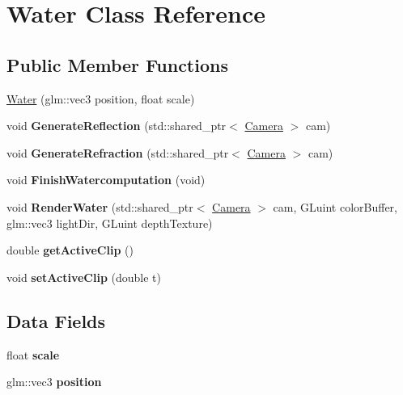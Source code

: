 \hypertarget{class_water}{}\section{Water Class Reference}
\label{class_water}
\subsection*{Public Member Functions}
\begin{DoxyCompactItemize}
\item 
\hyperlink{class_water_a456fec66ab6833de7615dc9fb212ae2a}{Water} (glm\+::vec3 position, float scale)
\item 
void {\bfseries Generate\+Reflection} (std\+::shared\+\_\+ptr$<$ \hyperlink{class_camera}{Camera} $>$ cam)\hypertarget{class_water_a665e0995f977f0797979bca4e621f8f8}{}\label{class_water_a665e0995f977f0797979bca4e621f8f8}

\item 
void {\bfseries Generate\+Refraction} (std\+::shared\+\_\+ptr$<$ \hyperlink{class_camera}{Camera} $>$ cam)\hypertarget{class_water_a2a57daac51ef0c634ced3f2523052cff}{}\label{class_water_a2a57daac51ef0c634ced3f2523052cff}

\item 
void {\bfseries Finish\+Watercomputation} (void)\hypertarget{class_water_aa69302dc7573d79027ef421dbed2f886}{}\label{class_water_aa69302dc7573d79027ef421dbed2f886}

\item 
void {\bfseries Render\+Water} (std\+::shared\+\_\+ptr$<$ \hyperlink{class_camera}{Camera} $>$ cam, G\+Luint color\+Buffer, glm\+::vec3 light\+Dir, G\+Luint depth\+Texture)\hypertarget{class_water_a305bbc4666b053999e2e76255ee9bff2}{}\label{class_water_a305bbc4666b053999e2e76255ee9bff2}

\item 
double {\bfseries get\+Active\+Clip} ()\hypertarget{class_water_af78362ca8b5b15433918a8b78ff5c5a5}{}\label{class_water_af78362ca8b5b15433918a8b78ff5c5a5}

\item 
void {\bfseries set\+Active\+Clip} (double t)\hypertarget{class_water_a67c2beafbe5bfff5e6b322de69a9194e}{}\label{class_water_a67c2beafbe5bfff5e6b322de69a9194e}

\end{DoxyCompactItemize}
\subsection*{Data Fields}
\begin{DoxyCompactItemize}
\item 
float {\bfseries scale}\hypertarget{class_water_a7854d71f9de93cd6c9bf359aea0e3d26}{}\label{class_water_a7854d71f9de93cd6c9bf359aea0e3d26}

\item 
glm\+::vec3 {\bfseries position}\hypertarget{class_water_a0b77ce54ad7c7b735c7d2fb25aeeefe5}{}\label{class_water_a0b77ce54ad7c7b735c7d2fb25aeeefe5}

\end{DoxyCompactItemize}
